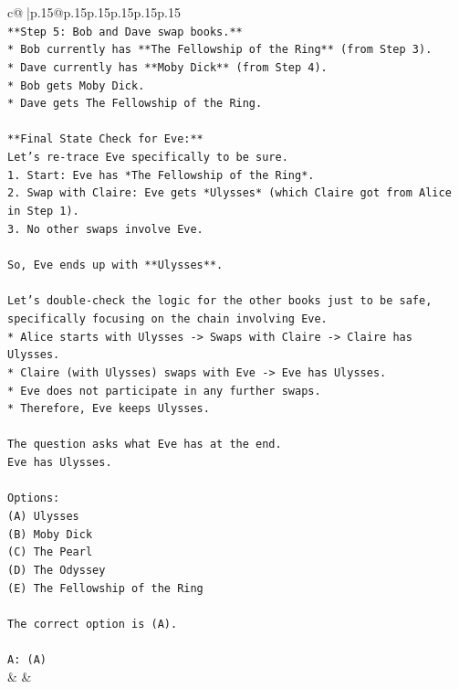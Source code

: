 \documentclass{article}
\begin{document}
{\begin{supertabular}{c@{$\;$}|p{.15\linewidth}@{}p{.15\linewidth}p{.15\linewidth}p{.15\linewidth}p{.15\linewidth}p{.15\linewidth}}
{{{\\ 
\texttt{**Step 5: Bob and Dave swap books.**} \\
\texttt{*   Bob currently has **The Fellowship of the Ring** (from Step 3).} \\
\texttt{*   Dave currently has **Moby Dick** (from Step 4).} \\
\texttt{*   Bob gets Moby Dick.} \\
\texttt{*   Dave gets The Fellowship of the Ring.} \\
\\ 
\texttt{**Final State Check for Eve:**} \\
\texttt{Let's re{-}trace Eve specifically to be sure.} \\
\texttt{1.  Start: Eve has *The Fellowship of the Ring*.} \\
\texttt{2.  Swap with Claire: Eve gets *Ulysses* (which Claire got from Alice in Step 1).} \\
\texttt{3.  No other swaps involve Eve.} \\
\\ 
\texttt{So, Eve ends up with **Ulysses**.} \\
\\ 
\texttt{Let's double{-}check the logic for the other books just to be safe, specifically focusing on the chain involving Eve.} \\
\texttt{*   Alice starts with Ulysses {-}> Swaps with Claire {-}> Claire has Ulysses.} \\
\texttt{*   Claire (with Ulysses) swaps with Eve {-}> Eve has Ulysses.} \\
\texttt{*   Eve does not participate in any further swaps.} \\
\texttt{*   Therefore, Eve keeps Ulysses.} \\
\\ 
\texttt{The question asks what Eve has at the end.} \\
\texttt{Eve has Ulysses.} \\
\\ 
\texttt{Options:} \\
\texttt{(A) Ulysses} \\
\texttt{(B) Moby Dick} \\
\texttt{(C) The Pearl} \\
\texttt{(D) The Odyssey} \\
\texttt{(E) The Fellowship of the Ring} \\
\\ 
\texttt{The correct option is (A).} \\
\\ 
\texttt{A: (A)} \\
            }
        }
    }
    & & \\ \\


\end{supertabular}}
\end{document}
